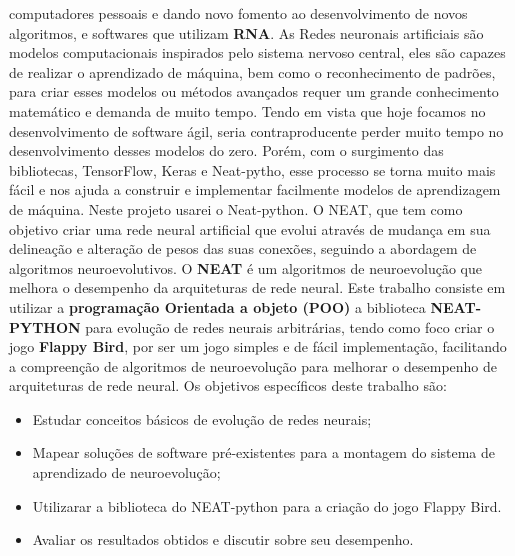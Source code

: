 computadores pessoais e dando novo fomento ao desenvolvimento de novos algoritmos, e softwares que utilizam \textbf{RNA}.
As Redes neuronais artificiais são modelos computacionais inspirados pelo sistema nervoso central, eles são capazes de realizar o aprendizado de máquina, bem como o reconhecimento de padrões,  para criar esses modelos ou métodos avançados  requer um grande conhecimento matemático e demanda de muito tempo. Tendo em vista que hoje focamos no desenvolvimento de software ágil, seria contraproducente perder muito tempo no desenvolvimento desses modelos do zero.
Porém, com o surgimento das bibliotecas, TensorFlow, Keras e Neat-pytho,	
esse processo se torna muito mais fácil e nos ajuda a construir e implementar facilmente  modelos de aprendizagem de máquina. Neste projeto usarei o
Neat-python.
O NEAT, que tem como objetivo criar uma rede neural artificial que evolui através de mudança em sua delineação e alteração de pesos das suas conexões, seguindo a abordagem de algoritmos neuroevolutivos.
O \textbf{NEAT} é um algoritmos de neuroevolução que melhora o desempenho da arquiteturas de rede neural.
Este trabalho consiste em utilizar a \textbf{programação Orientada a objeto (POO)} a biblioteca \textbf{NEAT-PYTHON} para evolução de redes neurais arbitrárias, tendo como foco
criar o jogo \textbf{Flappy Bird}, por ser um jogo simples e de fácil implementação, facilitando a compreenção de algoritmos de neuroevolução para melhorar o desempenho de arquiteturas de rede neural.
Os objetivos específicos deste trabalho são: \break 
\begin{itemize}
    \item Estudar conceitos básicos
de evolução de redes neurais;\\
     \item Mapear soluções de software pré-existentes para a montagem do sistema de aprendizado de neuroevolução;\\
     \item Utilizarar a biblioteca do NEAT-python para a criação do jogo Flappy Bird.\\
     \item Avaliar os resultados obtidos e discutir sobre seu desempenho.
\end{itemize} 


